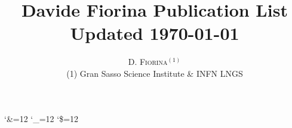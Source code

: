 \documentclass[a4paper,11pt,openright]{article}
\title{Davide Fiorina Publication List\\ Updated \today}
\author{%
    \textsc{D. Fiorina$^{(1)}$} \\[1ex]
    \normalsize (1) Gran Sasso Science Institute \& INFN LNGS
}
\date{}
\begin{document}
\maketitle

\nocite{*}
\catcode`\&=12 %
\catcode`\_=12 %
\catcode`\$=12 %

\end{document}
